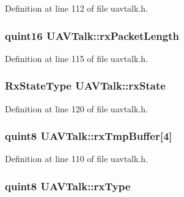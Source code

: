 \-Definition at line 112 of file uavtalk.\-h.

\hypertarget{group___u_a_v_talk_plugin_ga8ce408e2fe258de7a15c77540055a81d}{
\subsubsection[{rx\-Packet\-Length}]{\setlength{\rightskip}{0pt plus 5cm}quint16 {\bf \-U\-A\-V\-Talk\-::rx\-Packet\-Length}}}\label{group___u_a_v_talk_plugin_ga8ce408e2fe258de7a15c77540055a81d}


\-Definition at line 115 of file uavtalk.\-h.

\hypertarget{group___u_a_v_talk_plugin_gacce7e3b2035887b09dce0fdbba0f1b58}{
\subsubsection[{rx\-State}]{\setlength{\rightskip}{0pt plus 5cm}\-Rx\-State\-Type {\bf \-U\-A\-V\-Talk\-::rx\-State}}}\label{group___u_a_v_talk_plugin_gacce7e3b2035887b09dce0fdbba0f1b58}


\-Definition at line 120 of file uavtalk.\-h.

\hypertarget{group___u_a_v_talk_plugin_ga94d59693bfbe92bf000ee85b559693e0}{
\subsubsection[{rx\-Tmp\-Buffer}]{\setlength{\rightskip}{0pt plus 5cm}quint8 {\bf \-U\-A\-V\-Talk\-::rx\-Tmp\-Buffer}\mbox{[}4\mbox{]}}}\label{group___u_a_v_talk_plugin_ga94d59693bfbe92bf000ee85b559693e0}


\-Definition at line 110 of file uavtalk.\-h.

\hypertarget{group___u_a_v_talk_plugin_ga59962a309157ed27efad61d5bf85f650}{
\subsubsection[{rx\-Type}]{\setlength{\rightskip}{0pt plus 5cm}quint8 {\bf \-U\-A\-V\-Talk\-::rx\-Type}}}\label{group___u_a_v_talk_plugin_ga59962a309157ed27efad61d5bf85f650}


